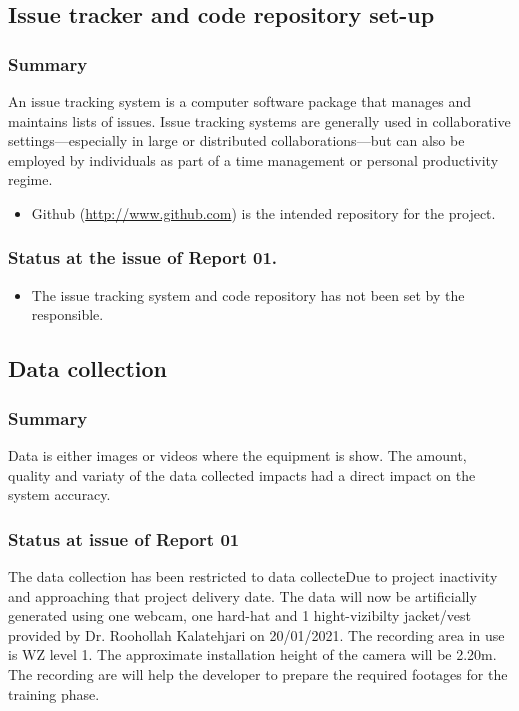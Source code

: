 \documentclass{article}
\begin{document}
\subsection{Issue tracker and code repository set-up}
\label{sec:org7ca60e3}
\subsubsection{Summary}
\label{sec:org67d7afa}
An issue tracking system is a computer software package that manages and maintains lists of issues.
Issue tracking systems are generally used in collaborative settings—especially in large or distributed collaborations—but can also be employed by individuals as part of a time management or personal productivity regime.

\begin{itemize}
\item Github (\url{http://www.github.com}) is the intended repository for the project.
\end{itemize}
\subsubsection{Status at the issue of Report 01.}
\label{sec:org9eb4937}
\begin{itemize}
\item The issue tracking system and code repository has not been set by the responsible.
\end{itemize}

\subsection{Data collection}
\label{sec:org0cd169a}

\subsubsection{Summary}
\label{sec:org4b1893a}
Data is either images or videos where the equipment is show.
The amount, quality and variaty of the data collected impacts had a direct impact on the system accuracy. 

\subsubsection{Status at issue of Report 01}
\label{sec:org1bcc186}
The data collection has been restricted to data collecteDue to project inactivity and approaching that project delivery date.
The data will now be artificially generated using one webcam, one hard-hat and 1 hight-vizibilty jacket/vest provided by Dr. Roohollah Kalatehjari on 20/01/2021.
The recording area in use is WZ level 1.
The approximate installation height of the camera will be 2.20m. 
The recording are will help the developer to prepare the required footages for the training phase. 
\end{document}
